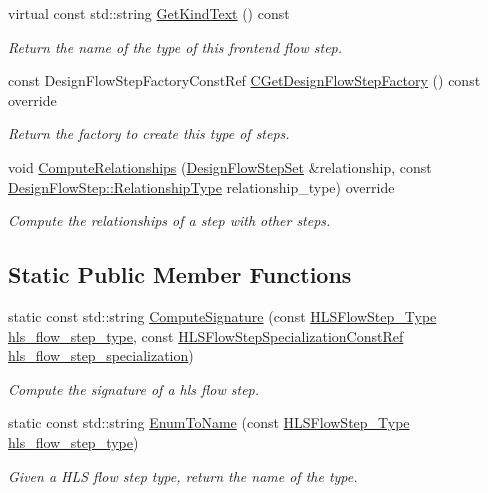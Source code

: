 \begin{DoxyCompactItemize}
virtual const std\+::string \hyperlink{classHLS__step_a1b5fed780e5f785be6405a8fbeaa093d}{Get\+Kind\+Text} () const
\begin{DoxyCompactList}\small\item\em Return the name of the type of this frontend flow step. \end{DoxyCompactList}\item 
const Design\+Flow\+Step\+Factory\+Const\+Ref \hyperlink{classHLS__step_a4c959ad5e9f100d5f0b0dd64b9883cd7}{C\+Get\+Design\+Flow\+Step\+Factory} () const override
\begin{DoxyCompactList}\small\item\em Return the factory to create this type of steps. \end{DoxyCompactList}\item 
void \hyperlink{classHLS__step_ad5c58777d9b466fb3eee185f6d3ac993}{Compute\+Relationships} (\hyperlink{classDesignFlowStepSet}{Design\+Flow\+Step\+Set} \&relationship, const \hyperlink{classDesignFlowStep_a723a3baf19ff2ceb77bc13e099d0b1b7}{Design\+Flow\+Step\+::\+Relationship\+Type} relationship\+\_\+type) override
\begin{DoxyCompactList}\small\item\em Compute the relationships of a step with other steps. \end{DoxyCompactList}\end{DoxyCompactItemize}
\subsection*{Static Public Member Functions}
\begin{DoxyCompactItemize}
\item 
static const std\+::string \hyperlink{classHLS__step_ad83e627f771dd1b2315f568321475316}{Compute\+Signature} (const \hyperlink{hls__step_8hpp_ada16bc22905016180e26fc7e39537f8d}{H\+L\+S\+Flow\+Step\+\_\+\+Type} \hyperlink{classHLS__step_aefd59af15346ec3f10bf12bd756e6777}{hls\+\_\+flow\+\_\+step\+\_\+type}, const \hyperlink{hls__step_8hpp_a5fdd2edf290c196531d21d68e13f0e74}{H\+L\+S\+Flow\+Step\+Specialization\+Const\+Ref} \hyperlink{classHLS__step_a843be75ba53b81876aa3c8b870ae8a55}{hls\+\_\+flow\+\_\+step\+\_\+specialization})
\begin{DoxyCompactList}\small\item\em Compute the signature of a hls flow step. \end{DoxyCompactList}\item 
static const std\+::string \hyperlink{classHLS__step_a4dfb9e61584699f0650b0a38eabbb31f}{Enum\+To\+Name} (const \hyperlink{hls__step_8hpp_ada16bc22905016180e26fc7e39537f8d}{H\+L\+S\+Flow\+Step\+\_\+\+Type} \hyperlink{classHLS__step_aefd59af15346ec3f10bf12bd756e6777}{hls\+\_\+flow\+\_\+step\+\_\+type})
\begin{DoxyCompactList}\small\item\em Given a H\+LS flow step type, return the name of the type. \end{DoxyCompactList}\end{DoxyCompactItemize}
